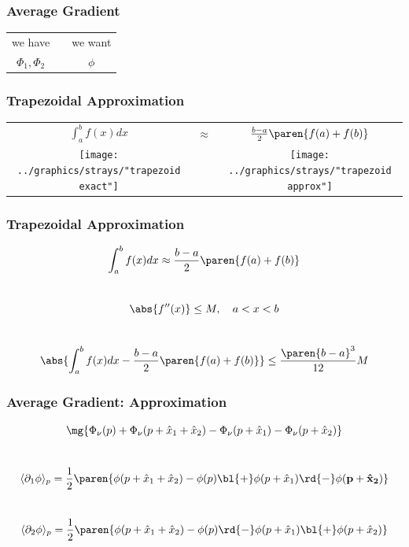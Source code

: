 \documentclass[handout]{beamer}
\begin{document}
\begin{frame}
  \frametitle{Average Gradient}  %
\begin{table}[htdp]  %
    \begin{center}
        \begin{tabular}{ccc}
            we have & \qquad \qquad & we want \\[15pt]
            $\Phi_{1}, \Phi_{2}$ & & $\phi$
        \end{tabular}
    \end{center}
\end{table}%
\end{frame}
\begin{frame}
  \frametitle{Trapezoidal Approximation}  %
\begin{table}[htdp]  %
    \begin{center}
        \begin{tabular}{ccc}
            $\int_{a}^{b} f(x) dx$ & $\approx$ & $\frac{b - a} {2} \paren{ f(a) + f(b) }$ \\[20pt]
            \texttt{[image: ../graphics/strays/"trapezoid exact"]} &&
            \texttt{[image: ../graphics/strays/"trapezoid approx"]}
        \end{tabular}
    \end{center}
\end{table}%
\end{frame}

\begin{frame}
  \frametitle{Trapezoidal Approximation}  %
  $$\int_{a}^{b} f(x) dx \approx \frac{b - a} {2} \paren{ f(a) + f(b) }$$ \\[10pt]
  \pause
  $$\abs{f''(x)} \le M, \quad a < x < b$$ \\[10pt]
  $$\abs{\int_{a}^{b} f(x) dx - \frac{b - a} {2} \paren{ f(a) + f(b) }} \le \frac{\paren{b-a}^3}{12} M$$
\end{frame}

\begin{frame}
  \frametitle{Average Gradient: Approximation}  %
  $$\mg{\Phi_{\nu}(p) + \Phi_{\nu}(p + \hat{x}_{1} + \hat{x}_{2}) - \Phi_{\nu}(p + \hat{x}_{1}) - \Phi_{\nu}(p + \hat{x}_{2})}$$\\[10pt]
  $$\langle \partial_{1}\phi \rangle_{p} = \frac{1}{2} 
  \paren{\phi(p+\hat{x}_{1}+\hat{x}_{2}) - \phi(p) \bl{\bf{+}} \phi(p+\hat{x}_{1}) \bf{\rd{ - }} \phi(p+\hat{x}_{2})}$$\\[10pt]
  $$\langle \partial_{2}\phi \rangle_{p} = \frac{1}{2} 
  \paren{\phi(p+\hat{x}_{1}+\hat{x}_{2}) - \phi(p) \rd{-} \phi(p+\hat{x}_{1}) \bl{+} \phi(p+\hat{x}_{2})}$$
\end{frame}
\end{document}
